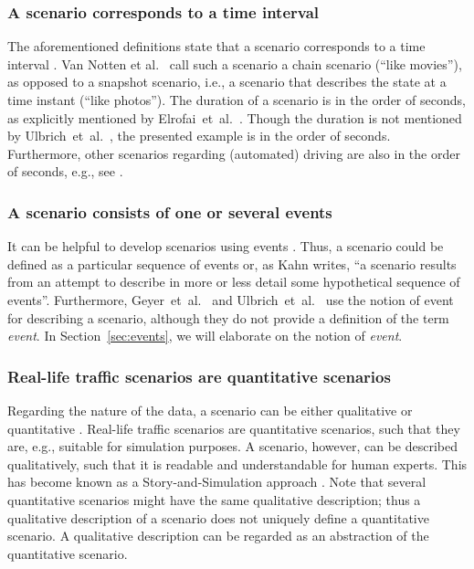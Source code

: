 \subsubsection{A scenario corresponds to a time interval}
The aforementioned definitions state that a scenario corresponds to a time interval \cite{go2004blind, geyer2014, ulbrich2015, elrofai2016scenario}. Van Notten et al.\ \cite{vannotten2003updated} call such a scenario a chain scenario (``like movies''), as opposed to a snapshot scenario, i.e., a scenario that describes the state at a time instant (``like photos''). The duration of a scenario is in the order of seconds, as explicitly mentioned by Elrofai~et~al.~\cite{elrofai2016scenario}. Though the duration is not mentioned by Ulbrich~et~al.~\cite{ulbrich2015}, the presented example is in the order of seconds. Furthermore, other scenarios regarding (automated) driving are also in the order of seconds, e.g., see \cite{gietelink2006development, zofka2015datadrivetrafficscenarios, roesener2017comprehensive, karaduman2013interactivebehavior, hulshof2013autonomous, englund2016grand}.

\subsubsection{A scenario consists of one or several events \cite{vannotten2003updated, go2004blind, geyer2014, ulbrich2015, kahn1962, englund2016grand, schoemaker1993multiple, cuppens2002alert, bach2016modelbased}}
It can be helpful to develop scenarios using events \cite{bishop2007scentechniques}. Thus, a scenario could be defined as a particular sequence of events or, as Kahn \cite{kahn1962} writes, ``a scenario results from an attempt to describe in more or less detail some hypothetical sequence of events''. Furthermore, Geyer~et~al.~\cite{geyer2014} and Ulbrich~et~al.~\cite{ulbrich2015} use the notion of event for describing a scenario, although they do not provide a definition of the term \emph{event}. In Section~\ref{sec:events}, we will elaborate on the notion of \emph{event}.

\subsubsection{Real-life traffic scenarios are quantitative scenarios}
Regarding the nature of the data, a scenario can be either qualitative or quantitative \cite{vannotten2003updated}. Real-life traffic scenarios are quantitative scenarios, such that they are, e.g., suitable for simulation purposes. A scenario, however, can be described qualitatively, such that it is readable and understandable for human experts. This has become known as a Story-and-Simulation approach \cite{alcamo2001scenarios}. Note that several quantitative scenarios might have the same qualitative description; thus a qualitative description of a scenario does not uniquely define a quantitative scenario. A qualitative description can be regarded as an abstraction of the quantitative scenario.
	
